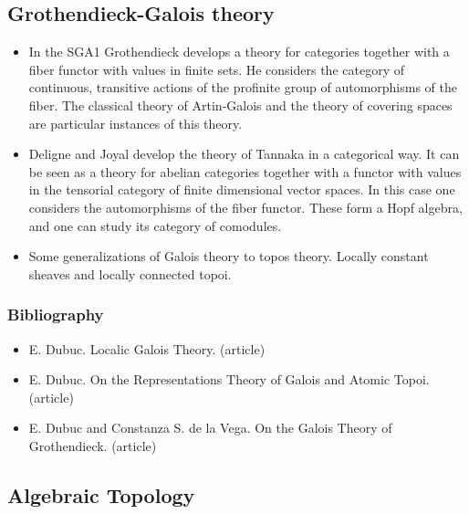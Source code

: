 \documentclass[spanish]{article}
\begin{document}
\hrulefill%

\subsection{Grothendieck-Galois theory}

\begin{itemize}
  \item
In the SGA1 Grothendieck develops a theory for categories together
with a fiber functor with values in finite sets. He considers the
category of continuous, transitive actions of the profinite group
of automorphisms of the fiber. The classical theory
of Artin-Galois and the theory of covering spaces are particular
instances of this theory.

  \item
Deligne and Joyal develop the theory of Tannaka in a categorical way.
It can be seen as a theory for abelian categories together with a functor
with values in the tensorial category of finite dimensional vector spaces.
In this case one considers the automorphisms of the fiber functor. These
form a Hopf algebra, and one can study its category of comodules.

  \item
Some generalizations of Galois theory to topos theory. Locally constant
sheaves and locally connected topoi.

\end{itemize}


\subsubsection{Bibliography}
\begin{itemize}
  \item
E. Dubuc. Localic Galois Theory. (article)
  \item
E. Dubuc. On the Representations Theory of Galois and Atomic Topoi. (article)
  \item
E. Dubuc and Constanza S. de la Vega. On the Galois Theory of Grothendieck. (article)

\end{itemize}


\hrulefill%

\subsection{Algebraic Topology}
\end{document}
